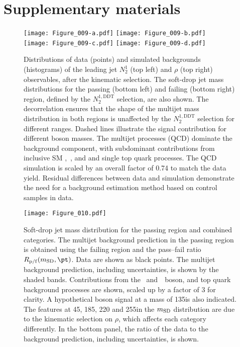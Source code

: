 \documentclass[11pt,twoside,a4paper,cmspaper,final,collab]{cms-tdr}
\begin{document}
\clearpage
\appendix

\section{Supplementary materials}
\label{app:suppMat}

\begin{figure}[!htb]
\begin{center}
\texttt{[image: Figure\_009-a.pdf]} \hfil
\texttt{[image: Figure\_009-b.pdf]}\\
\texttt{[image: Figure\_009-c.pdf]} \hfil
\texttt{[image: Figure\_009-d.pdf]}
\end{center}
\caption{
Distributions of data (points) and simulated backgrounds (histograms) 
of the leading \pt jet $N_2^{1}$ (top left) and $\rho$ (top right) observables, 
after the kinematic selection. The soft-drop jet mass distributions 
for the passing (bottom left) and failing (bottom right) region, defined by the $N_2^{1,\text{DDT}}$ selection, are also shown. 
The decorrelation ensures that the shape of the multijet mass distribution in both regions is unaffected by the 
$N_2^{1,\text{DDT}}$ selection for different \pt ranges.
Dashed lines illustrate the signal contribution for different \PZpr boson masses.
The multijet processes (QCD) dominate the background component, with subdominant contributions from inclusive SM \PW,~\PZ,
and \ttbar and single top quark processes.
The QCD simulation is scaled by an overall factor of 0.74 to match the data yield.
Residual differences between data and simulation 
demonstrate the need for a background estimation method based on control samples in data.
\label{fig:aux_stack}
}
\end{figure}

\begin{figure}[!htb]
\begin{center}
\texttt{[image: Figure\_010.pdf]}
\end{center}
\caption{
Soft-drop jet mass distribution for the passing region and combined \pt categories.
The multijet background prediction in the passing region is obtained using the failing region and the pass--fail ratio $R_{\rm p/f}(m_\text{SD},\pt)$.
Data are shown as black points.
The multijet background prediction, including uncertainties, is shown by the shaded bands.
Contributions from the \PW~and~\PZ~boson, and top quark background processes 
are shown, scaled up by a factor of 3 for clarity.
A hypothetical \PZpr boson signal at a mass of 135\GeV is also indicated.
The features at 45, 185, 220 and 255\GeV in the $m_{\rm SD}$ distribution are due to the kinematic selection on $\rho$, which affects each \pt category differently.
In the bottom panel, the ratio of the data to the background prediction, including uncertainties, is shown.
\label{fig:aux_postfit_s_135_cat6}}
\end{figure}
\end{document}
